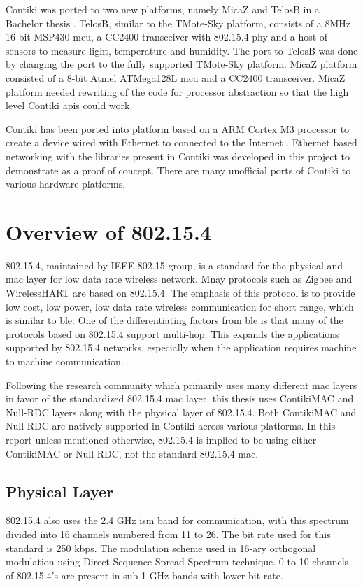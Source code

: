 Contiki was ported to two new platforms, namely MicaZ and TelosB in a Bachelor thesis \cite{stan2007porting}. TelosB, similar to the TMote-Sky platform, consists of a 8MHz 16-bit MSP430 \gls{mcu}, a CC2400 transceiver with 802.15.4 \gls{phy} and a host of sensors to measure light, temperature and humidity. The port to TelosB was done by changing the port to the fully supported TMote-Sky platform. MicaZ platform consisted of a 8-bit Atmel ATMega128L \gls{mcu} and a CC2400 transceiver. MicaZ platform needed rewriting of the code for processor abstraction so that the high level Contiki \glspl{api} could work.

Contiki has been ported into platform based on a ARM Cortex M3 processor to create a device wired with Ethernet to connected to the Internet \cite{Wilde2013a}. Ethernet based networking with the libraries present in Contiki was developed in this project to demonstrate as a proof of concept. There are many unofficial ports of Contiki to various hardware platforms.

\section{Overview of 802.15.4} \label{Overview15.4}
802.15.4, maintained by IEEE 802.15 group, is a standard for the physical and \gls{mac} layer for low data rate wireless network\cite{IEEE802154}. Mnay protocols such as Zigbee and WirelessHART are based on 802.15.4. The emphasis of this protocol is to provide low cost, low power, low data rate wireless communication for short range, which is similar to \gls{ble}. One of the differentiating factors from \gls{ble} is that many of the protocols based on 802.15.4 support multi-hop. This expands the applications supported by 802.15.4 networks, especially when the application requires machine to machine communication.

Following the research community which primarily uses many different \gls{mac} layers in favor of the standardized 802.15.4 \gls{mac} layer, this thesis uses ContikiMAC and Null-RDC layers along with the physical layer of 802.15.4. Both ContikiMAC and Null-RDC are natively supported in Contiki across various platforms. In this report unless mentioned otherwise, 802.15.4 is implied to be using either ContikiMAC or Null-RDC, not the standard 802.15.4 \gls{mac}.

\subsection{Physical Layer}
802.15.4 also uses the 2.4 GHz \gls{ism} band for communication, with this spectrum divided into 16 channels numbered from 11 to 26. The bit rate used for this standard is 250 kbps. The modulation scheme used in 16-ary orthogonal modulation using Direct Sequence Spread Spectrum technique. 0 to 10 channels of 802.15.4's are present in sub 1 GHz bands with lower bit rate.

